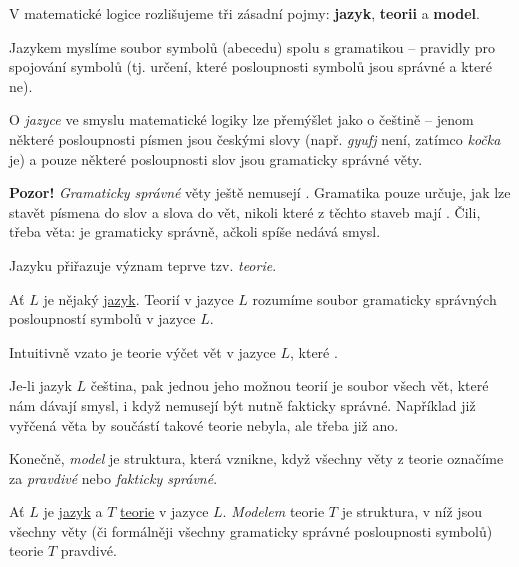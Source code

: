 V matematické logice rozlišujeme tři zásadní pojmy: \textbf{jazyk},
\textbf{teorii} a \textbf{model}.

\begin{definition}[Jazyk]
  \label{def:jazyk}
  Jazykem myslíme soubor symbolů (abecedu) spolu s gramatikou -- pravidly pro
  spojování symbolů (tj. určení, které posloupnosti symbolů jsou správné a které
  ne).
\end{definition}

\begin{parable}
  \label{par:jazyk}
  O \emph{jazyce} ve smyslu matematické logiky lze přemýšlet jako o češtině --
  jenom některé posloupnosti písmen jsou českými slovy (např. \emph{gyufj} není,
  zatímco \emph{kočka} je) a pouze některé posloupnosti slov jsou gramaticky
  správné věty.

  \textbf{Pozor!} \emph{Gramaticky správné} věty ještě nemusejí
  . Gramatika pouze určuje, jak lze stavět písmena do slov a
  slova do vět, nikoli které z těchto staveb mají . Čili, třeba
  věta:  je gramaticky správně,
  ačkoli spíše nedává smysl.
\end{parable}

Jazyku přiřazuje význam teprve tzv. \emph{teorie}.

\begin{definition}[Teorie]
  \label{def:teorie}
  Ať $L$ je nějaký \hyperref[def:jazyk]{jazyk}. Teorií v jazyce $L$ rozumíme
  soubor gramaticky správných posloupností symbolů v jazyce $L$.

  Intuitivně vzato je teorie výčet vět v jazyce $L$, které .
\end{definition}

\begin{parable}
  \label{par:teorie}
  Je-li jazyk $L$ čeština, pak jednou jeho možnou teorií je soubor všech vět,
  které nám dávají smysl, i když nemusejí být nutně fakticky správné. Například
  již vyřčená věta  by součástí
  takové teorie nebyla, ale třeba  již ano.
\end{parable}

Konečně, \emph{model} je struktura, která vznikne, když všechny věty z teorie
označíme za \emph{pravdivé} nebo \emph{fakticky správné}.

\begin{definition}[Model]
  \label{def:model}
  Ať $L$ je \hyperref[def:jazyk]{jazyk} a $T$ \hyperref[def:teorie]{teorie} v
  jazyce $L$. \emph{Modelem} teorie $T$ je struktura, v níž jsou všechny věty
  (či formálněji všechny gramaticky správné posloupnosti symbolů) teorie $T$
  pravdivé.
\end{definition}

